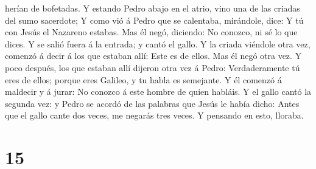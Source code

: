 herían de bofetadas.  Y estando Pedro abajo en el atrio,
vino una de las criadas del sumo sacerdote;  Y como vió á
Pedro que se calentaba, mirándole, dice: Y tú con Jesús el Nazareno
estabas.  Mas él negó, diciendo: No conozco, ni sé lo que
dices. Y se salió fuera á la entrada; y cantó el gallo. 
Y la criada viéndole otra vez, comenzó á decir á los que estaban allí:
Este es de ellos.  Mas él negó otra vez. Y poco después,
los que estaban allí dijeron otra vez á Pedro: Verdaderamente tú eres de
ellos; porque eres Galileo, y tu habla es semejante.  Y
él comenzó á maldecir y á jurar: No conozco á este hombre de quien
habláis.  Y el gallo cantó la segunda vez: y Pedro se
acordó de las palabras que Jesús le había dicho: Antes que el gallo
cante dos veces, me negarás tres veces. Y pensando en esto, lloraba.

\hypertarget{section-14}{%
\section{15}\label{section-14}}

